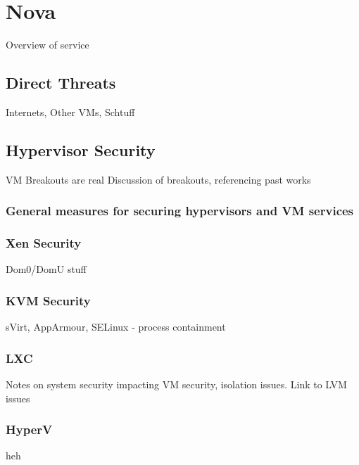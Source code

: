 \section{Nova}
Overview of service
\subsection{Direct Threats}
Internets, Other VMs, Schtuff
\subsection{Hypervisor Security}
VM Breakouts are real
Discussion of breakouts, referencing past works
\subsubsection{General measures for securing hypervisors and VM services}
\subsubsection{Xen Security}
Dom0/DomU stuff
\subsubsection{KVM Security}
sVirt, AppArmour, SELinux - process containment
\subsubsection{LXC}
Notes on system security impacting VM security, isolation issues. Link to LVM issues
\subsubsection{HyperV}
heh

